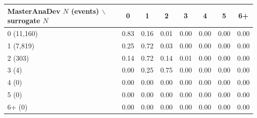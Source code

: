 \begin{tabular}{lccccccc}
\toprule
MasterAnaDev $N$ (events) $\backslash$ surrogate $N$ & 0 & 1 & 2 & 3 & 4 & 5 & 6+ \\
\midrule
0 (11,160) & 0.83 & 0.16 & 0.01 & 0.00 & 0.00 & 0.00 & 0.00 \\
1 (7,819) & 0.25 & 0.72 & 0.03 & 0.00 & 0.00 & 0.00 & 0.00 \\
2 (303) & 0.14 & 0.72 & 0.14 & 0.01 & 0.00 & 0.00 & 0.00 \\
3 (4) & 0.00 & 0.25 & 0.75 & 0.00 & 0.00 & 0.00 & 0.00 \\
4 (0) & 0.00 & 0.00 & 0.00 & 0.00 & 0.00 & 0.00 & 0.00 \\
5 (0) & 0.00 & 0.00 & 0.00 & 0.00 & 0.00 & 0.00 & 0.00 \\
6+ (0) & 0.00 & 0.00 & 0.00 & 0.00 & 0.00 & 0.00 & 0.00 \\
\bottomrule
\end{tabular}
